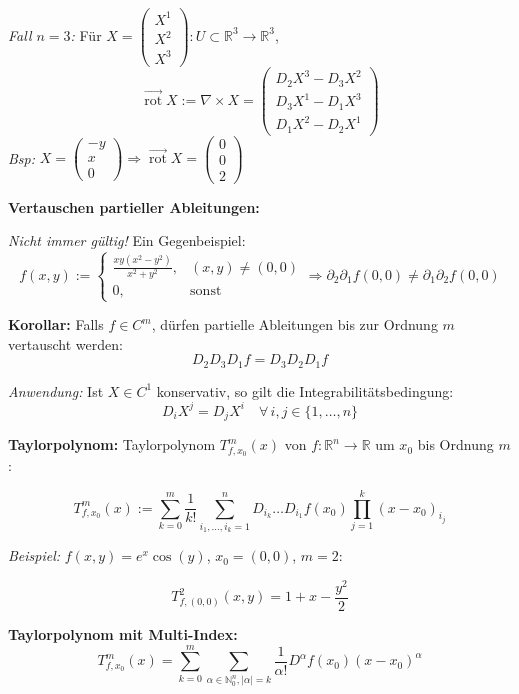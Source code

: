 \textit{Fall \(n=3\):} Für \( X = \begin{pmatrix} X^1 \\ X^2 \\ X^3 \end{pmatrix} : U \subset \mathbb{R}^3 \to \mathbb{R}^3 \),
\[
\vec{\operatorname{rot}} X := \nabla \times X = \begin{pmatrix}
D_2 X^3 - D_3 X^2 \\
D_3 X^1 - D_1 X^3 \\
D_1 X^2 - D_2 X^1
\end{pmatrix}
\]
\textit{Bsp:} \( X = \begin{pmatrix} -y \\ x \\ 0 \end{pmatrix} \Rightarrow \vec{\operatorname{rot}} X = \begin{pmatrix} 0 \\ 0 \\ 2 \end{pmatrix} \)

\textbf{Vertauschen partieller Ableitungen:}

\textit{Nicht immer gültig!} Ein Gegenbeispiel:
\[
f(x,y) := \begin{cases}
\frac{xy(x^2 - y^2)}{x^2 + y^2}, & (x,y)\neq(0,0) \\
0, & \text{sonst}
\end{cases}
\Rightarrow \partial_2 \partial_1 f(0,0) \ne \partial_1 \partial_2 f(0,0)
\]

\textbf{Korollar:} Falls \(f \in C^m\), dürfen partielle Ableitungen bis zur Ordnung \(m\) vertauscht werden:
\[
D_2 D_3 D_1 f = D_3 D_2 D_1 f
\]

\textit{Anwendung:} Ist \(X \in C^1\) konservativ, so gilt die Integrabilitätsbedingung:
\[
D_i X^j = D_j X^i \quad \forall\, i,j \in \{1,\dots,n\}
\]

\textbf{Taylorpolynom:} Taylorpolynom $T_{f,x_0}^m(x)$ von $f: \mathbb{R}^n \to \mathbb{R}$ um $x_0$ bis Ordnung $m$:

\[
T_{f,x_0}^m(x) := \sum_{k=0}^{m} \frac{1}{k!} \sum_{i_1,\dots,i_k=1}^{n} D_{i_k} \dots D_{i_1}f(x_0) \prod_{j=1}^{k}(x - x_0)_{i_j}
\]

\textit{Beispiel:} $f(x,y) = e^x\cos(y)$, $x_0 = (0,0)$, $m = 2$:

\[
T_{f,(0,0)}^2(x,y) = 1 + x - \frac{y^2}{2}
\]

\textbf{Taylorpolynom mit Multi-Index:}
\[
T^m_{f,x_0}(x) = \sum_{k=0}^m \sum_{\alpha \in \mathbb{N}_0^n, |\alpha| = k} \frac{1}{\alpha!} D^\alpha f(x_0) (x - x_0)^\alpha
\]

